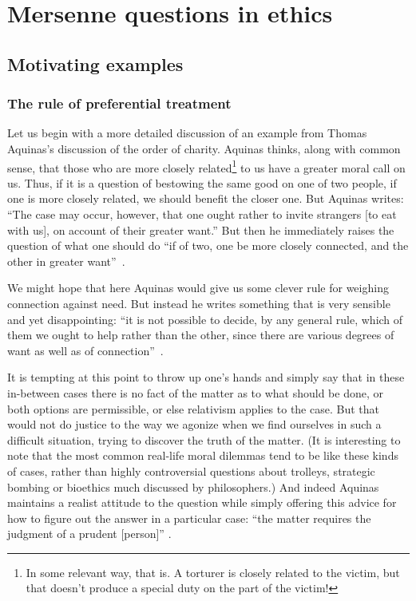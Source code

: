 \def\mychapter{II}

\chapter{Mersenne questions in ethics}\label{ch:ethics}
\section{Motivating examples}
\subsection{The rule of preferential treatment}\label{sec:preferential}
Let us begin with a more detailed discussion of an example from Thomas Aquinas's discussion of the order of charity. Aquinas thinks,
along with common sense, that those who are more closely related\footnote{In some relevant way, that is.
A torturer is closely related to the victim, but that doesn't produce a special duty on the part of the victim!} to 
us have a greater moral call on us.
Thus, if it is a question of bestowing the same good on one of two people, if one is more closely related,
we should benefit the closer one. But Aquinas writes: ``The case may occur, however, that one 
ought rather to invite strangers [to eat with us], on 
account of their greater want.'' But then he immediately raises the question of what one should do ``if of two, one be 
more closely connected, and the other in greater want''~\parencite[II-II Q31 A3 Rp.~1]{AquinasST}.

We might hope that here Aquinas would give us some clever rule for weighing connection against need. But 
instead he writes something that is very sensible and yet disappointing: ``it is not possible to decide, by any general rule, which of them we ought 
to help rather than the other, since there are various degrees of want as well as of connection''~\parencite[II-II Q31 A3 Rp.~1]{AquinasST}.

It is
tempting at this point to throw up one's hands and simply say that in these in-between cases there is no
fact of the matter as to what should be done, or both options are permissible, or else relativism applies
to the case. But that would not do justice to the way we agonize when we find ourselves in such a difficult 
situation, trying to discover the truth of the matter. (It is interesting to note that the most common real-life moral dilemmas
tend to be like these kinds of cases, rather than highly controversial questions about trolleys, strategic bombing or
bioethics much discussed by philosophers.)
And indeed Aquinas maintains a realist attitude to
the question while simply offering this advice for how to figure out the answer in a particular case: ``the matter 
requires the judgment of a prudent [person]'' \parencite[II-II Q31 A3 Rp.~1]{AquinasST}.

